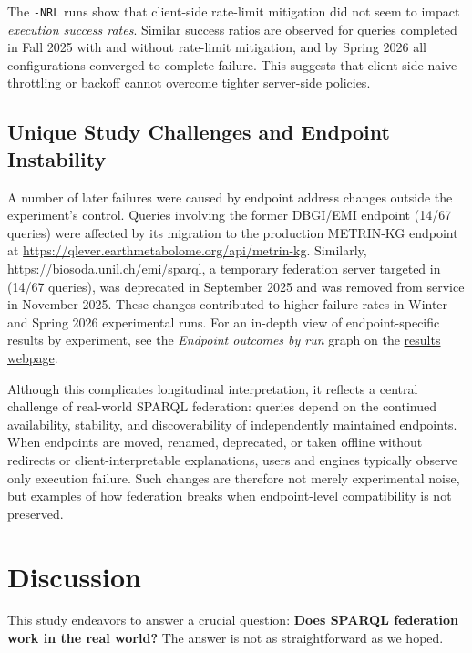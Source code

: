 \documentclass[runningheads]{llncs}
\begin{document}
The \texttt{-NRL} runs show that client-side rate-limit mitigation did not seem to impact \emph{execution success rates}. 
Similar success ratios are observed for queries completed in Fall 2025 with and without rate-limit mitigation, and by Spring 2026 all configurations converged to complete failure. 
This suggests that client-side naive throttling or backoff cannot overcome tighter server-side policies.


\subsection{Unique Study Challenges and Endpoint Instability}\label{sec5.4}

A number of later failures were caused by endpoint address changes outside the experiment’s control. 
Queries involving the former DBGI/EMI endpoint (14/67 queries) were affected by its migration to the production METRIN-KG endpoint at \url{https://qlever.earthmetabolome.org/api/metrin-kg}. 
Similarly, \url{https://biosoda.unil.ch/emi/sparql}, a temporary federation server targeted in (14/67 queries), was deprecated in September 2025 and was removed from service in November 2025. 
These changes contributed to higher failure rates in Winter and Spring 2026 experimental runs.
For an in-depth view of endpoint-specific results by experiment, see the \textit{Endpoint outcomes by run} graph on the \href{https://ecrum19.github.io/fed-survey-results/}{results webpage}.

Although this complicates longitudinal interpretation, it reflects a central challenge of real-world SPARQL federation: queries depend on the continued availability, stability, and discoverability of independently maintained endpoints. 
When endpoints are moved, renamed, deprecated, or taken offline without redirects or client-interpretable explanations, users and engines typically observe only execution failure. 
Such changes are therefore not merely experimental noise, but examples of how federation breaks when endpoint-level compatibility is not preserved.


\section{Discussion}\label{sec6}

This study endeavors to answer a crucial question: \textbf{Does SPARQL federation work in the real world?} 
The answer is not as straightforward as we hoped. 
\end{document}

